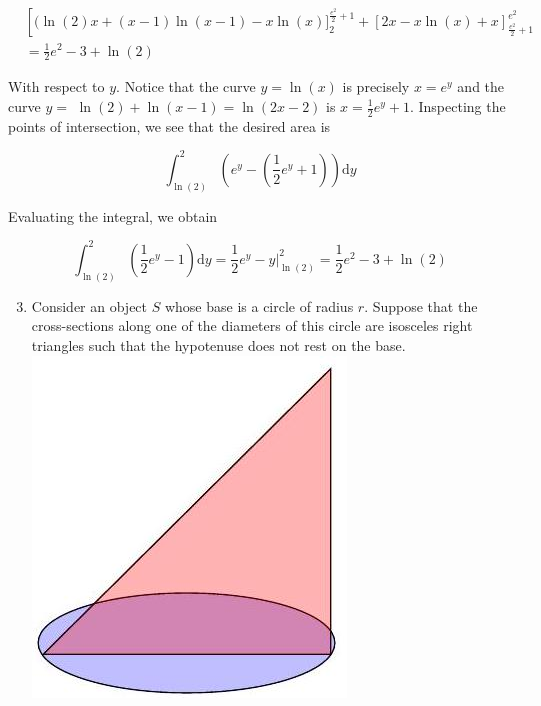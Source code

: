 \documentclass[10pt]{article}
\begin{document}
$$
\begin{aligned}
& {\left[(\ln (2) x+(x-1) \ln (x-1)-x \ln (x)]_{2}^{\frac{e^{2}}{2}+1}+[2 x-x \ln (x)+x]_{\frac{e^{2}}{2}+1}^{e^{2}}\right.} \\
& =\frac{1}{2} e^{2}-3+\ln (2)
\end{aligned}
$$

With respect to $y$. Notice that the curve $y=\ln (x)$ is precisely $x=e^{y}$ and the curve $y=$ $\ln (2)+\ln (x-1)=\ln (2 x-2)$ is $x=\frac{1}{2} e^{y}+1$. Inspecting the points of intersection, we see that the desired area is

$$
\int_{\ln (2)}^{2}\left(e^{y}-\left(\frac{1}{2} e^{y}+1\right)\right) \mathrm{d} y
$$

Evaluating the integral, we obtain

$$
\int_{\ln (2)}^{2}\left(\frac{1}{2} e^{y}-1\right) \mathrm{d} y=\frac{1}{2} e^{y}-\left.y\right|_{\ln (2)} ^{2}=\frac{1}{2} e^{2}-3+\ln (2)
$$

\begin{enumerate}
  \setcounter{enumi}{2}
  \item Consider an object $S$ whose base is a circle of radius $r$. Suppose that the cross-sections along one of the diameters of this circle are isosceles right triangles such that the hypotenuse does not rest on the base.\\
\includegraphics[max width=\textwidth, center]{2024_12_27_3b8e65ac2e3b34a6249eg-4}
\end{enumerate}
\end{document}
